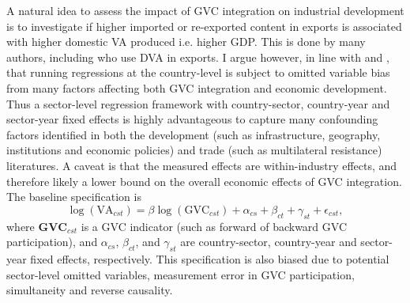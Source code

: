 \documentclass[a4paper]{article}
\begin{document}
A natural idea to assess the impact of GVC integration on industrial development is to investigate if higher imported or re-exported content in exports is associated with higher domestic VA produced i.e. higher GDP. This is done by many authors, including \citep{lwesya2022integration} who use DVA in exports. I argue however, in line with \citep{rodriguez2000trade} and \citet{Kummritz20161}, that running regressions at the country-level is subject to omitted variable bias from many factors affecting both GVC integration and economic development. Thus a sector-level regression framework with country-sector, country-year and sector-year fixed effects is highly advantageous to capture many confounding factors identified in both the development (such as infrastructure, geography, institutions and economic policies) and trade (such as multilateral resistance) literatures. A caveat is that the measured effects are within-industry effects, and therefore likely a lower bound on the overall economic effects of GVC integration. The baseline specification is 
\begin{equation} \label{eq:VA_HDFE}
\log(\text{VA}_{cst}) = \beta \log(\text{GVC}_{cst}) + \alpha_{cs} + \beta_{ct} +\gamma_{st} + \epsilon_{cst},
\end{equation}
where $\textbf{GVC}_{cst}$ is a GVC indicator (such as forward of backward GVC participation), and 
$\alpha_{cs}$, $\beta_{ct}$, and $\gamma_{st}$ are country-sector, country-year and sector-year fixed effects, respectively. This specification is also biased due to potential sector-level omitted variables, measurement error in GVC participation, simultaneity and reverse causality.  \newline
\end{document}
